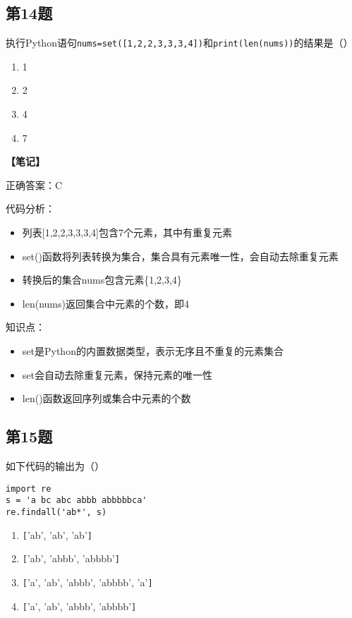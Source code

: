 \subsection{第14题}
执行Python语句\texttt{nums=set([1,2,2,3,3,3,4])}和\texttt{print(len(nums))}的结果是（）

\begin{enumerate}[label=\Alph*.]
  \item 1
  \item 2
  \item 4
  \item 7
\end{enumerate}

\begin{mdframed}[linewidth=1pt, linecolor=black]

  \textbf{\color{red}【笔记】}

  正确答案：C

  代码分析：
  \begin{itemize}
    \item 列表[1,2,2,3,3,3,4]包含7个元素，其中有重复元素
    \item set()函数将列表转换为集合，集合具有元素唯一性，会自动去除重复元素
    \item 转换后的集合nums包含元素\{1,2,3,4\}
    \item len(nums)返回集合中元素的个数，即4
  \end{itemize}

  知识点：
  \begin{itemize}
    \item set是Python的内置数据类型，表示无序且不重复的元素集合
    \item set会自动去除重复元素，保持元素的唯一性
    \item len()函数返回序列或集合中元素的个数
  \end{itemize}

\end{mdframed}

\subsection{第15题}
如下代码的输出为（）
\begin{lstlisting}
import re
s = 'a bc abc abbb abbbbbca'
re.findall('ab*', s)
\end{lstlisting}

\begin{enumerate}[label=\Alph*.]
  \item \verb|[|'ab', 'ab', 'ab'\verb|]|
  \item \verb|[|'ab', 'abbb', 'abbbb'\verb|]|
  \item \verb|[|'a', 'ab', 'abbb', 'abbbb', 'a'\verb|]|
  \item \verb|[|'a', 'ab', 'abbb', 'abbbb'\verb|]|
\end{enumerate}

